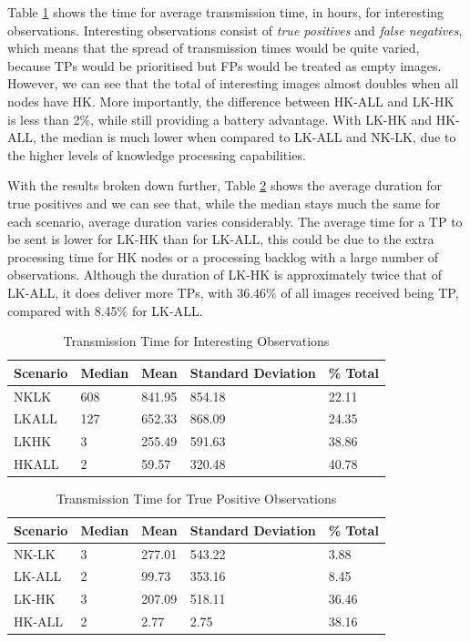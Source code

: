 Table \ref{tab:observ_int} shows the time for average transmission time, in hours, for interesting observations. Interesting observations consist of \textit{true positives} and \textit{false negatives}, which means that the spread of transmission times would be quite varied, because TPs would be prioritised but FPs would be treated as empty images. However, we can see that the total of interesting images almost doubles when all nodes have HK. More importantly, the difference between HK-ALL and LK-HK is less than 2\%, while still providing a battery advantage. With LK-HK and HK-ALL, the median is much lower when compared to LK-ALL and NK-LK, due to the higher levels of knowledge processing capabilities.

With the results broken down further, Table \ref{tab:observ_tp} shows the average duration for true positives and we can see that, while the median stays much the same for each scenario, average duration varies considerably. The average time for a TP to be sent is lower for LK-HK than for LK-ALL, this could be due to the extra processing time for HK nodes or a processing backlog with a large number of observations. Although the duration of LK-HK is approximately twice that of LK-ALL, it does deliver more TPs, with 36.46\% of all images received being TP, compared with 8.45\% for LK-ALL.

\begin{table}[h]\footnotesize
\begin{tabularx}{\textwidth}{ |X|X|X|X|X|}
\hline
Scenario & Median & Mean & Standard Deviation & \% Total\\
\hline
NKLK & 608 & 841.95 & 854.18 & 22.11\\
LKALL & 127 & 652.33 & 868.09 & 24.35\\
LKHK & 3 & 255.49 & 591.63 & 38.86\\
HKALL & 2 & 59.57 & 320.48 & 40.78\\
\hline
\end{tabularx}
\caption{Transmission Time for Interesting Observations}\label{tab:observ_int}
\end{table}

\begin{table}[h]\footnotesize
\begin{tabularx}{\textwidth}{ |X|X|X|X|X|}
\hline
Scenario & Median & Mean & Standard Deviation & \% Total\\
\hline
NK-LK & 3 & 277.01 & 543.22 & 3.88\\
LK-ALL & 2 & 99.73 & 353.16 & 8.45\\
LK-HK & 3 & 207.09 & 518.11 & 36.46\\
HK-ALL & 2 & 2.77 & 2.75 & 38.16\\
\hline
\end{tabularx}
\caption{Transmission Time for True Positive Observations}\label{tab:observ_tp}
\end{table}

